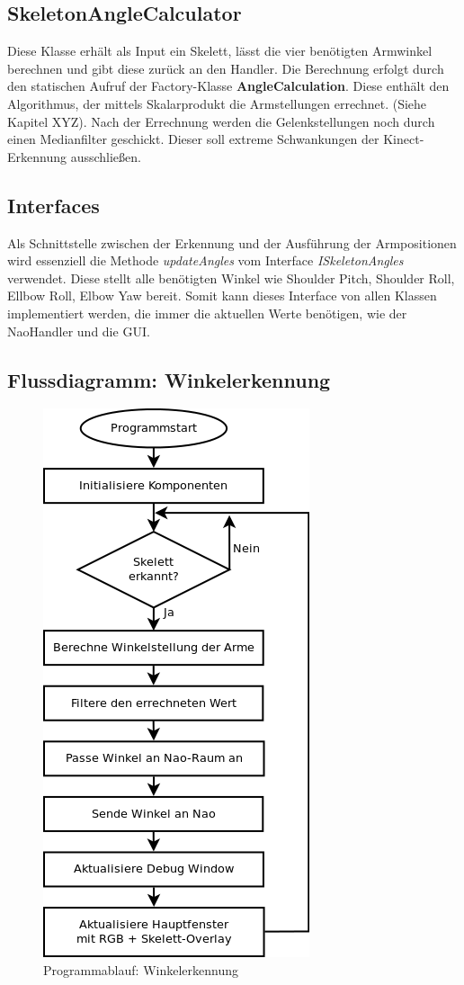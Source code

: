 %
%

\subsection{SkeletonAngleCalculator}
Diese Klasse erhält als Input ein Skelett, lässt die vier benötigten Armwinkel berechnen und gibt diese zurück an den Handler. Die Berechnung erfolgt durch den statischen Aufruf der Factory-Klasse \textbf{AngleCalculation}. Diese enthält den Algorithmus, der mittels Skalarprodukt die Armstellungen errechnet. (Siehe Kapitel XYZ). Nach der Errechnung werden die Gelenkstellungen noch durch einen Medianfilter geschickt. Dieser soll extreme Schwankungen der Kinect-Erkennung ausschließen.


\subsection{Interfaces}
Als Schnittstelle zwischen der Erkennung und der Ausführung der Armpositionen wird essenziell die Methode \textit{updateAngles} vom Interface \textit{ISkeletonAngles} verwendet. Diese stellt alle benötigten Winkel wie Shoulder Pitch, Shoulder Roll, Ellbow Roll, Elbow Yaw bereit. Somit kann dieses Interface von allen Klassen implementiert werden, die immer die aktuellen Werte benötigen, wie der NaoHandler und die GUI.


\subsection{Flussdiagramm: Winkelerkennung}
	\begin{figure}[H]						
		\centering							
		\includegraphics[scale=0.8]{Bilder/Flussdiagramm.png}			
		\caption{Programmablauf: Winkelerkennung}						
		\label{f:pap}						
	\end{figure}
